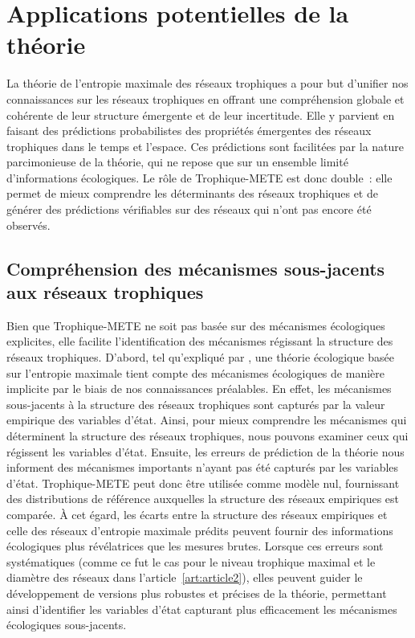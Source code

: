 
\section{Applications potentielles de la théorie} 

La théorie de l'entropie maximale des réseaux trophiques a pour but d'unifier
nos connaissances sur les réseaux trophiques en offrant une compréhension
globale et cohérente de leur structure émergente et de leur incertitude. Elle y
parvient en faisant des prédictions probabilistes des propriétés émergentes des
réseaux trophiques dans le temps et l'espace. Ces prédictions sont facilitées
par la nature parcimonieuse de la théorie, qui ne repose que sur un ensemble
limité d'informations écologiques. Le rôle de Trophique-METE est donc double~:
elle permet de mieux comprendre les déterminants des réseaux trophiques et de
générer des prédictions vérifiables sur des réseaux qui n'ont pas encore été
observés.

\subsection{Compréhension des mécanismes sous-jacents aux réseaux trophiques} 

Bien que Trophique-METE ne soit pas basée sur des mécanismes écologiques
explicites, elle facilite l'identification des mécanismes régissant la structure
des réseaux trophiques. D'abord, tel qu'expliqué par
\textcite{Harte2014Maximum}, une théorie écologique basée sur l'entropie
maximale tient compte des mécanismes écologiques de manière implicite par le
biais de nos connaissances préalables. En effet, les mécanismes sous-jacents à
la structure des réseaux trophiques sont capturés par la valeur empirique des
variables d'état. Ainsi, pour mieux comprendre les mécanismes qui déterminent la
structure des réseaux trophiques, nous pouvons examiner ceux qui régissent les
variables d'état. Ensuite, les erreurs de prédiction de la théorie nous
informent des mécanismes importants n'ayant pas été capturés par les variables
d'état. Trophique-METE peut donc être utilisée comme modèle nul, fournissant des
distributions de référence auxquelles la structure des réseaux empiriques est
comparée. À cet égard, les écarts entre la structure des réseaux empiriques et
celle des réseaux d'entropie maximale prédits peuvent fournir des informations
écologiques plus révélatrices que les mesures brutes. Lorsque ces erreurs sont
systématiques (comme ce fut le cas pour le niveau trophique maximal et le
diamètre des réseaux dans l'article~\ref{art:article2}), elles peuvent guider le
développement de versions plus robustes et précises de la théorie, permettant
ainsi d'identifier les variables d'état capturant plus efficacement les
mécanismes écologiques sous-jacents. 

